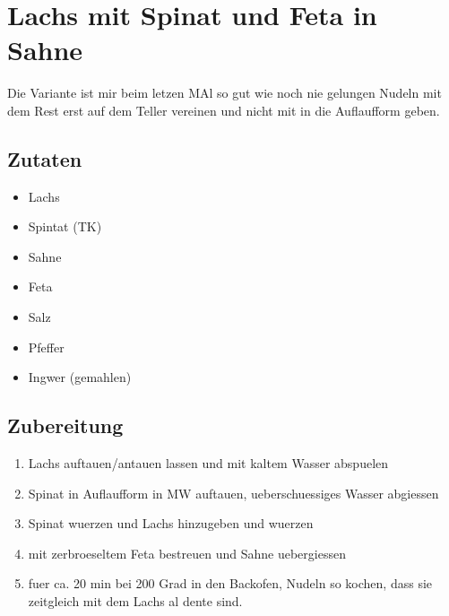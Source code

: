 \part{Lachs mit Spinat und Feta in Sahne}
\label{lachsmitspinatundfetainsahne}

Die Variante ist mir beim letzen MAl so gut wie noch nie gelungen
Nudeln mit dem Rest erst auf dem Teller vereinen und nicht mit in die Auflaufform geben.

\chapter{Zutaten}
\label{zutaten}

\begin{itemize}
\item Lachs

\item Spintat (TK)

\item Sahne

\item Feta

\item Salz

\item Pfeffer

\item Ingwer (gemahlen)

\end{itemize}

\chapter{Zubereitung}
\label{zubereitung}

\begin{enumerate}
\item Lachs auftauen\slash antauen lassen und mit kaltem Wasser abspuelen

\item Spinat in Auflaufform in MW auftauen, ueberschuessiges Wasser abgiessen

\item Spinat wuerzen und Lachs hinzugeben und wuerzen

\item mit zerbroeseltem Feta bestreuen und Sahne uebergiessen

\item fuer ca. 20 min bei 200 Grad in den Backofen, Nudeln so kochen, dass sie zeitgleich mit dem Lachs al dente sind.

\end{enumerate}
